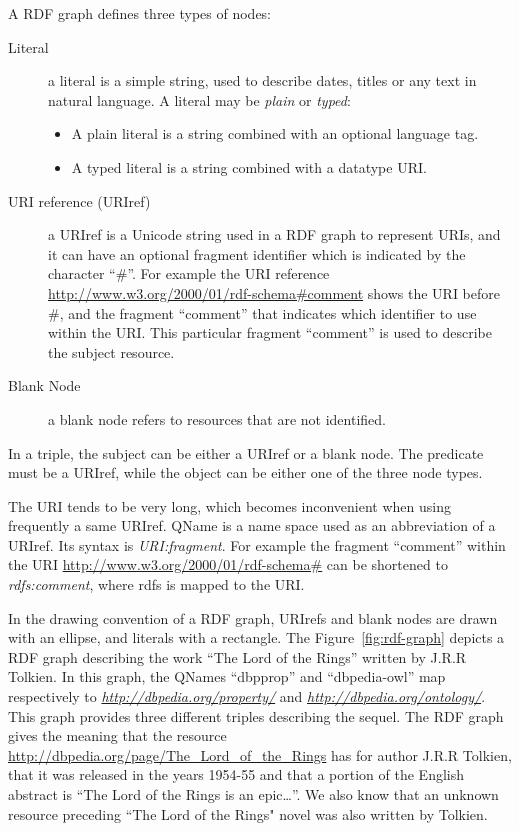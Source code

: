 A RDF graph defines three types of nodes:
\begin{description}
\item[Literal] a literal is a simple string, used to describe dates, titles or
any text in natural language. A literal may be \emph{plain} or \emph{typed}:
	\begin{itemize}
	  \item A plain literal is a string combined with an optional language tag.
	  \item A typed literal is a string combined with a datatype URI.
	\end{itemize}
\item[URI reference (URIref)] a URIref is a Unicode string used in a RDF graph
to represent URIs, and it can have an optional fragment identifier which is
indicated by the character ``\#''. For example the URI reference
\url{http://www.w3.org/2000/01/rdf-schema#comment} shows the URI before \#, and
the fragment ``comment'' that indicates which identifier to use within the URI.
This particular fragment ``comment'' is used to describe the subject resource.
\item[Blank Node] a blank node refers to resources that are not identified.
\end{description}
In a triple, the subject can be either a URIref or a blank node. The predicate
must be a URIref, while the object can be either one of the three node types.

The URI tends to be very long, which becomes inconvenient when using frequently
a same URIref. QName is a name space used as an abbreviation of a URIref. Its
syntax is \emph{URI:fragment}. For example the fragment ``comment'' within the
URI \url{http://www.w3.org/2000/01/rdf-schema#} can be shortened to
\emph{rdfs:comment}, where rdfs is mapped to the URI.

In the drawing convention of a RDF graph, URIrefs and blank nodes are drawn with an
ellipse, and literals with a rectangle. The Figure~\ref{fig:rdf-graph} depicts
a RDF graph describing the work ``The Lord of the Rings'' written by J.R.R
Tolkien. In this graph, the QNames ``dbpprop'' and ``dbpedia-owl'' map
respectively to \emph{\url{http://dbpedia.org/property/}} and
\emph{\url{http://dbpedia.org/ontology/}}. This graph provides three different
triples describing the sequel. The RDF graph gives the meaning that the
resource \url{http://dbpedia.org/page/The_Lord_of_the_Rings} has for author
J.R.R Tolkien, that it was released in the years 1954-55 and that a portion of
the English abstract is ``The Lord of the Rings is an epic\ldots''. We also
know that an unknown resource preceding ``The Lord of the Rings" novel was also
written by Tolkien.

